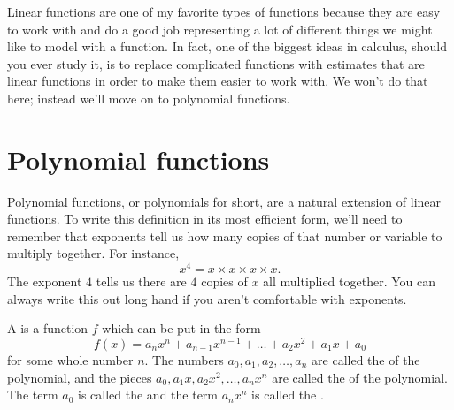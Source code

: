 \documentclass{ximera}
\begin{document}
Linear functions are one of my favorite types of functions because they are easy to work with and do a good job representing a lot of different things we might like to model with a function. In fact, one of the biggest ideas in calculus, should you ever study it, is to replace complicated functions with estimates that are linear functions in order to make them easier to work with. We won't do that here; instead we'll move on to polynomial functions.

\section{Polynomial functions}
Polynomial functions, or polynomials for short, are a natural extension of linear functions. To write this definition in its most efficient form, we'll need to remember that exponents tell us how many copies of that number or variable to multiply together. For instance, 
\[
x^4 = x \times x \times x \times x.
\]
The exponent $4$ tells us there are $4$ copies of $x$ all multiplied together. You can always write this out long hand if you aren't comfortable with exponents.
\begin{definition}
A  is a function $f$ which can be put in the form
\[
f(x) = a_nx^n+a_{n-1}x^{n-1} + \dots + a_2x^2 + a_1 x + a_0
\]
for some whole number $n$. The numbers $a_0, a_1, a_2, \dots, a_n$ are called the  of the polynomial, and the pieces $a_0, a_1x, a_2x^2, \dots, a_nx^n$ are called the  of the polynomial. The term $a_0$ is called the  and the term $a_nx^n$ is called the .
\end{definition}
\end{document}
